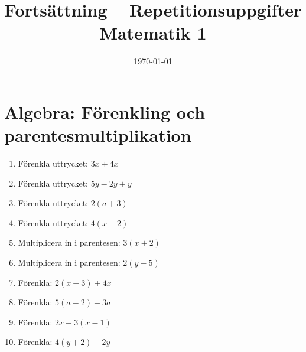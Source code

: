 \documentclass[a4paper,11pt]{article}
\title{Fortsättning -- Repetitionsuppgifter Matematik 1}
\author{}
\date{\today}
\begin{document}
\maketitle

\section*{Algebra: Förenkling och parentesmultiplikation}
\begin{enumerate}[label=\textbf{A\arabic*.}]
    \item Förenkla uttrycket: $3x + 4x$
    \item Förenkla uttrycket: $5y - 2y + y$
    \item Förenkla uttrycket: $2(a + 3)$
    \item Förenkla uttrycket: $4(x - 2)$
    \item Multiplicera in i parentesen: $3(x + 2)$
    \item Multiplicera in i parentesen: $2(y - 5)$
    \item Förenkla: $2(x + 3) + 4x$
    \item Förenkla: $5(a - 2) + 3a$
    \item Förenkla: $2x + 3(x - 1)$
    \item Förenkla: $4(y + 2) - 2y$
\end{enumerate}
\newpage
\end{document}

